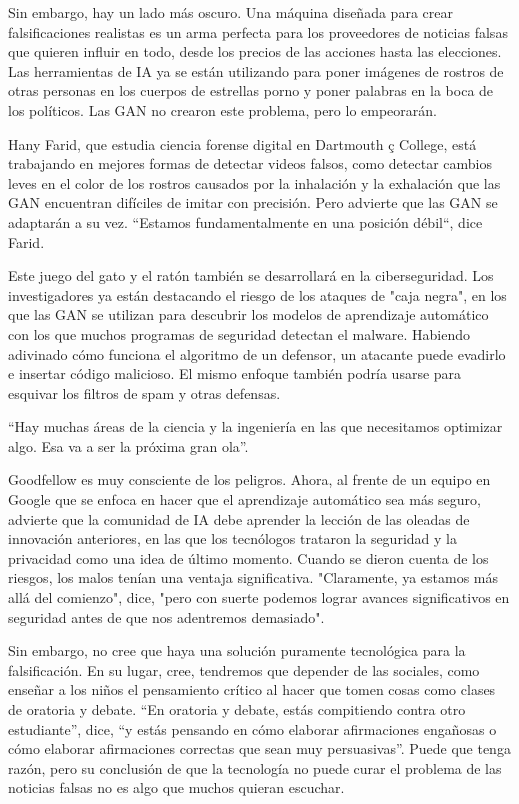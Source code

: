 \documentclass[a4paper]{article}
\begin{document}
Sin embargo, hay un lado más oscuro. Una máquina diseñada para crear falsificaciones realistas es un arma perfecta para los proveedores de noticias falsas que quieren influir en todo, desde los precios de las acciones hasta las elecciones. Las herramientas de IA ya se están utilizando para poner imágenes de rostros de otras personas en los cuerpos de estrellas porno y poner palabras en la boca de los políticos. Las GAN no crearon este problema, pero lo empeorarán.
 
 Hany Farid, que estudia ciencia forense digital en Dartmouth ç College, está trabajando en mejores formas de detectar videos  falsos, como detectar cambios leves en el color de los rostros  causados por la inhalación y la exhalación que las GAN encuentran difíciles de imitar con precisión. Pero advierte que las GAN se  adaptarán a su vez. ``Estamos fundamentalmente en una posición  débil``, dice Farid.


Este juego del gato y el ratón también se desarrollará en la ciberseguridad. Los investigadores ya están destacando el riesgo de los ataques de "caja negra", en los que las GAN se utilizan para descubrir los modelos de aprendizaje automático con los que muchos programas de seguridad detectan el malware. Habiendo adivinado cómo funciona el algoritmo de un defensor, un atacante puede evadirlo e insertar código malicioso. El mismo enfoque también podría usarse para esquivar los filtros de spam y otras defensas.

“Hay muchas áreas de la ciencia y la ingeniería en las que necesitamos optimizar algo. Esa va a ser la próxima gran ola”.

Goodfellow es muy consciente de los peligros. Ahora, al frente de un equipo en Google que se enfoca en hacer que el aprendizaje automático sea más seguro, advierte que la comunidad de IA debe aprender la lección de las oleadas de innovación anteriores, en las que los tecnólogos trataron la seguridad y la privacidad como una idea de último momento. Cuando se dieron cuenta de los riesgos, los malos tenían una ventaja significativa. "Claramente, ya estamos más allá del comienzo", dice, "pero con suerte podemos lograr avances significativos en seguridad antes de que nos adentremos demasiado".

Sin embargo, no cree que haya una solución puramente tecnológica para la falsificación. En su lugar, cree, tendremos que depender de las sociales, como enseñar a los niños el pensamiento crítico al hacer que tomen cosas como clases de oratoria y debate. “En oratoria y debate, estás compitiendo contra otro estudiante”, dice, “y estás pensando en cómo elaborar afirmaciones engañosas o cómo elaborar afirmaciones correctas que sean muy persuasivas”. Puede que tenga razón, pero su conclusión de que la tecnología no puede curar el problema de las noticias falsas no es algo que muchos quieran escuchar.
\end{document}
